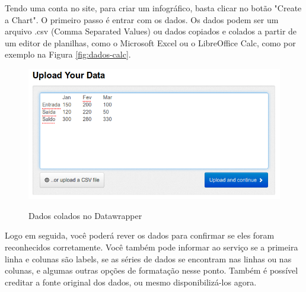 \documentclass[12pt,onecolumn]{article}
\begin{document}
    Tendo uma conta no site, para criar um infográfico, basta clicar no botão 
    "Create a Chart". O primeiro passo é entrar com os dados. Os dados podem ser 
    um arquivo .csv (Comma Separated Values) ou dados copiados e colados a partir
    de um editor de planilhas, como o Microsoft Excel ou o LibreOffice Calc, como
    por exemplo na Figura \ref{fig:dados-calc}.
    
    \begin{figure}[H]
      \begin{center}
        \includegraphics[scale = 0.4]{dados-datawrapper.png}
        \label{fig:dados-datawrapper}
        \caption{Dados colados no Datawrapper}
      \end{center}
    \end{figure}
    
    Logo em seguida, você poderá rever os dados para confirmar se eles foram
    reconhecidos corretamente. Você também pode informar ao serviço se a primeira
    linha e colunas são labels, se as séries de dados se encontram nas linhas ou
    nas colunas, e algumas outras opções de formatação nesse ponto. Também é
    possível creditar a fonte original dos dados, ou mesmo disponibilizá-los agora.
    
\end{document}
